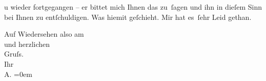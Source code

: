                u wieder fortgegangen – er bittet mich Ihnen das zu ſagen und ihn {\pb}in dieſem Sinn \introOben{}bei
                  Ihnen\introOben{} zu entſchuldigen. Was hiemit geſchieht. Mir hat es ſehr Leid
               gethan.\pend
           
\pstart
           Auf Wiedersehen also am{\\[\baselineskip]}\label{K_L04070-3v}\label{K_L04070-3} und
               herzlichen{\\[\baselineskip]} Gruſs.{\\[\baselineskip]} Ihr{\\[\baselineskip]}\spacefill\mbox{A.}\pend
           \leftskip=0em{}\endnumbering{}
\begin{anhang}
\end{anhang}\newcommand{\dateiname}{L04070}\newcommand{\titel}{Arthur Schnitzler an Gustav Schwarzkopf, 15. 6. 1905}\newcommand{\editorInnen}{Herausgegeben von Jahnke, SelmaMüller, Martin Anton}
